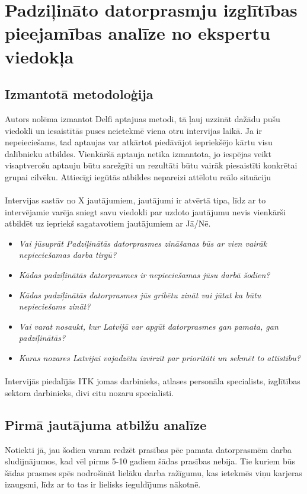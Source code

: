 \section{Padziļināto datorprasmju izglītības pieejamības analīze no ekspertu viedokļa}
\subsection{Izmantotā metodoloģija}
Autors nolēma izmantot Delfi aptajuas metodi, tā ļauj uzzināt dažādu pušu viedokli un iesaistītās puses
neietekmē viena otru intervijas laikā. Ja ir nepeieciešams, tad aptaujas var atkārtot piedāvājot iepriekšējo
kārtu visu dalībnieku atbildes. Vienkāršā aptauja netika izmantota, jo iespējas veikt visaptverošu aptauju būtu sarežgīti
un rezultāti būtu vairāk piesaistīti konkrētai grupai cilvēku. Attiecīgi iegūtās atbildes nepareizi attēlotu reālo situāciju
\paragraph{}
Intervijas sastāv no X jautājumiem, jautājumi ir atvērtā tipa, līdz ar to intervējamie varēja sniegt savu viedokli par
uzdoto jautājumu nevis vienkārši atbildēt uz iepriekš sagatavotiem jautājumiem ar Jā/Nē.
\begin{itemize}
    \item \textit{Vai jūsuprāt Padziļinātās datorprasmes zināšanas būs ar vien vairāk nepieciešamas darba tirgū?}
    \item \textit{Kādas padziļinātās datorprasmes ir nepieciešamas jūsu darbā šodien?}
    \item \textit{Kādas padziļinātās datorprasmes jūs gribētu zināt vai jūtat ka būtu nepieciešams zināt?}
    \item \textit{Vai varat nosaukt, kur Latvijā var apgūt datorprasmes gan pamata, gan padziļinātās?}
    \item \textit{Kuras nozares Latvijai vajadzētu izvirzīt par prioritāti un sekmēt to attīstību?}
\end{itemize}
\paragraph{}
Intervijās piedalījās ITK jomas darbinieks, atlases personāla specialists, izglītības sektora darbinieks,
divi citu nozaru specialisti.
\subsection{Pirmā jautājuma atbilžu analīze}
Notiekti jā, jau šodien varam redzēt prasības pēc pamata datorprasmēm darba sludijnājumos, kad vēl pirms 5-10 gadiem
šādas prasības nebija.
Tie kuriem būs šādas prasmes spēs nodrošināt lielāku darba ražīgumu, kas ietekmēs viņu karjeras izaugsmi, līdz ar to 
tas ir lielisks ieguldījums nākotnē.
